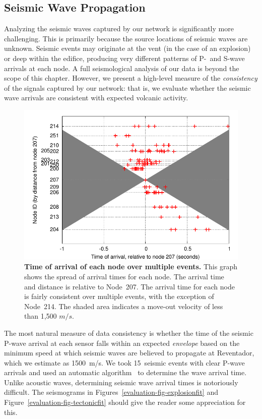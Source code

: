 \subsection{Seismic Wave Propagation}

Analyzing the seismic waves captured by our network is significantly more
challenging. This is primarily because the source locations of seismic waves
are unknown. Seismic events may originate at the vent (in the case of an
explosion) or deep within the edifice, producing very different patterns of
P-~and S-wave arrivals at each node. A full seismological analysis of our
data is beyond the scope of this chapter. However, we present a high-level
measure of the \textit{consistency} of the signals captured by our network:
that is, we evaluate whether the seismic wave arrivals are consistent with
expected volcanic activity.

\begin{figure}[t]
\begin{center}
\includegraphics[width=0.8\hsize]{./3-evaluation/figs/arrivaltimes.pdf}
\end{center}

\caption{\textbf{Time of arrival of each node over multiple events.} This
graph shows the spread of arrival times for each node. The arrival time and
distance is relative to Node~207. The arrival time for each node is fairly
consistent over multiple events, with the exception of Node~214. The shaded
area indicates a move-out velocity of less than 1,500 $m/s$.}

\label{evaluation-fig-arrivaltimes}
\end{figure}

The most natural measure of data consistency is whether the time of the
seismic P-wave arrival at each sensor falls within an expected
\textit{envelope} based on the minimum speed at which seismic waves are
believed to propagate at Reventador, which we estimate as 1500~m/s. We took
15~seismic events with clear P-wave arrivals and used an automatic
algorithm~\cite{pwave-picking} to determine the wave arrival time. Unlike
acoustic waves, determining seismic wave arrival times is notoriously
difficult. The seismograms in Figures~\ref{evaluation-fig-explosionfit} and
Figure~\ref{evaluation-fig-tectonicfit} should give the reader some
appreciation for this.

